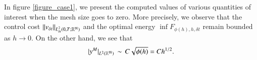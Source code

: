 %  
%
%
%  
%


In figure \ref{figure_case1}, we present the computed values of various quantities of interest when the mesh size goes to zero. More precisely, we observe that the control cost $\|v_{\delta t}\|_{L^2_{\delta t}(0,T;\mathbb R^{\mathfrak{M}})}$ and the optimal energy $\inf F_{\phi(h),h,\delta t}$ remain bounded as $h\to 0$. On the other hand, we see that 
\begin{align}\label{control_norm_behavior}
	|y^M|_{L^2(\mathbb{R}^{\mathfrak{M}})}\,\sim\,C\sqrt{\phi(h)}=Ch^{1/2}. 
\end{align}

